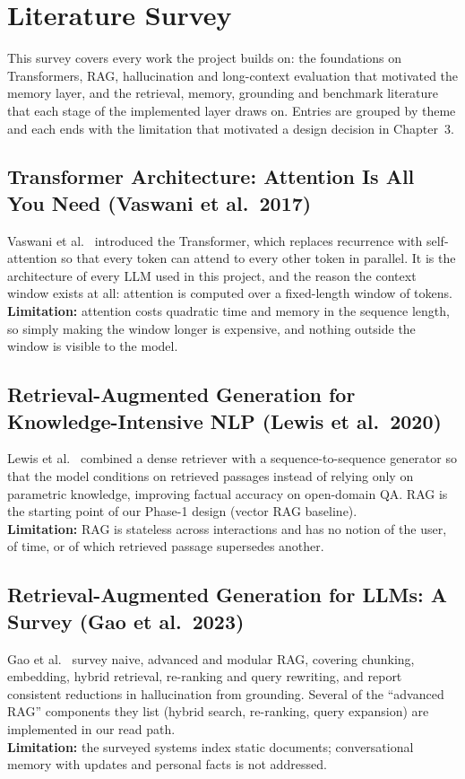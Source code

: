 
\section{Literature Survey}
This survey covers every work the project builds on: the foundations on Transformers, RAG, hallucination
and long-context evaluation that motivated the memory layer, and the retrieval, memory, grounding and
benchmark literature that each stage of the implemented layer draws on. Entries are grouped by theme and
each ends with the limitation that motivated a design decision in Chapter~3.

\subsection{Transformer Architecture: Attention Is All You Need (Vaswani et al.\ 2017)}
Vaswani et al.\ \cite{vaswani2017} introduced the Transformer, which replaces recurrence with
self-attention so that every token can attend to every other token in parallel. It is the architecture
of every LLM used in this project, and the reason the context window exists at all: attention is computed
over a fixed-length window of tokens. \\
\textbf{Limitation:} attention costs quadratic time and memory in the sequence length, so simply making
the window longer is expensive, and nothing outside the window is visible to the model.

\subsection{Retrieval-Augmented Generation for Knowledge-Intensive NLP (Lewis et al.\ 2020)}
Lewis et al.\ \cite{lewis2020} combined a dense retriever with a sequence-to-sequence generator so that
the model conditions on retrieved passages instead of relying only on parametric knowledge, improving
factual accuracy on open-domain QA. RAG is the starting point of our Phase-1 design (vector RAG baseline). \\
\textbf{Limitation:} RAG is stateless across interactions and has no notion of the user, of time, or of
which retrieved passage supersedes another.

\subsection{Retrieval-Augmented Generation for LLMs: A Survey (Gao et al.\ 2023)}
Gao et al.\ \cite{gao2023} survey naive, advanced and modular RAG, covering chunking, embedding, hybrid
retrieval, re-ranking and query rewriting, and report consistent reductions in hallucination from
grounding. Several of the ``advanced RAG'' components they list (hybrid search, re-ranking, query
expansion) are implemented in our read path. \\
\textbf{Limitation:} the surveyed systems index static documents; conversational memory with updates and
personal facts is not addressed.

